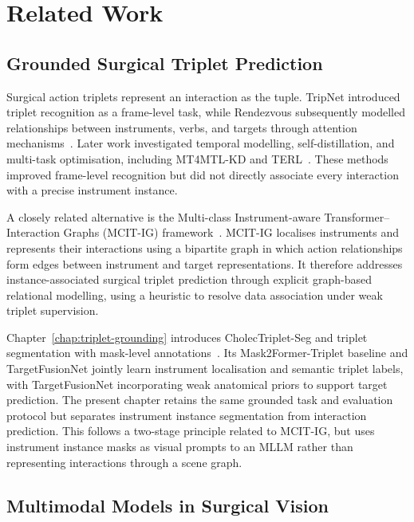\section{Related Work}
\label{sec:c5:related-work}

\subsection{Grounded Surgical Triplet Prediction}

Surgical action triplets represent an interaction as the \ivttriplet tuple. TripNet introduced triplet recognition as a frame-level task, while Rendezvous subsequently modelled relationships between instruments, verbs, and targets through attention mechanisms~\cite{1nywoye_rec_action_triplets,NWOYE2022102433_rendevous}. Later work investigated temporal modelling, self-distillation, and multi-task optimisation, including MT4MTL-KD and TERL~\cite{gui2023mt4mtl,gui2024tail}. These methods improved frame-level recognition but did not directly associate every interaction with a precise instrument instance.

A closely related alternative is the Multi-class Instrument-aware Transformer--Interaction Graphs (MCIT-IG) framework~\cite{sharma2023surgical}. MCIT-IG localises instruments and represents their interactions using a bipartite graph in which action relationships form edges between instrument and target representations. It therefore addresses instance-associated surgical triplet prediction through explicit graph-based relational modelling, using a heuristic to resolve data association under weak triplet supervision.

Chapter~\ref{chap:triplet-grounding} introduces CholecTriplet-Seg and triplet segmentation with mask-level annotations~\cite{alabi2026grounding}. Its Mask2Former-Triplet baseline and TargetFusionNet jointly learn instrument localisation and semantic triplet labels, with TargetFusionNet incorporating weak anatomical priors to support target prediction. The present chapter retains the same grounded task and evaluation protocol but separates instrument instance segmentation from interaction prediction. This follows a two-stage principle related to MCIT-IG, but uses instrument instance masks as visual prompts to an MLLM rather than representing interactions through a scene graph.

\subsection{Multimodal Models in Surgical Vision}

